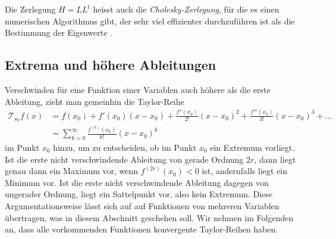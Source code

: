 Die Zerlegung $H=LL^t$ heisst auch die {\em Cholesky-Zerlegung}, für die
\label{Cholesky-Zerlegung}%
es einen numerischen Algorithmus gibt, der sehr viel effizienter
durchzuführen ist als die Bestimmung der Eigenwerte
\cite[Abschnitt 12.3]{buch:linalg}.


%
%
\subsection{Extrema und höhere Ableitungen
\label{buch:fuvar:hessesche:subsection:extrema}}
Verschwinden für eine Funktion einer Variablen auch höhere als die erste
Ableitung, zieht man gemeinhin die Taylor-Reihe
\begin{align*}
\mathscr{T_{x_0}}f(x)
&=
f(x_0) + f'(x_0)(x-x_0)
+
\frac{f''(x_0)}{2!}(x-x_0)^2
+
\frac{f'''(x_0)}{3!}(x-x_0)^3
+
\dots
\\
&=
\sum_{k=0}^\infty \frac{f^{(k)}(x_0)}{k!}(x-x_0)^k
\end{align*}
im Punkt $x_0$ hinzu, um zu entscheiden, ob im Punkt $x_0$ ein Extremum
vorliegt.
Ist die erste nicht verschwindende Ableitung von gerade Ordnung $2r$, dann
liegt genau dann ein Maximum vor, wenn $f^{(2r)}(x_0)<0$ ist, andernfalls
liegt ein Minimum vor.
Ist die erste nicht verschwindende Ableitung dagegen von ungerader Ordnung,
liegt ein Sattelpunkt vor, also kein Extremum.
Diese Argumentationsweise lässt sich auf auf Funktionen von mehreren
Variablen übertragen, was in diesem Abschnitt geschehen soll.
Wir nehmen im Folgenden an, dass alle vorkommenden Funktionen konvergente
Taylor-Reihen haben.

%
%

